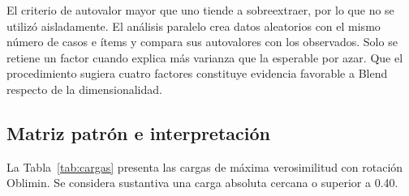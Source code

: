 \documentclass[11pt,letterpaper]{article}
\begin{document}
El criterio de autovalor mayor que uno tiende a sobreextraer, por lo que no se utilizó aisladamente. El análisis paralelo crea datos aleatorios con el mismo número de casos e ítems y compara sus autovalores con los observados. Solo se retiene un factor cuando explica más varianza que la esperable por azar. Que el procedimiento sugiera cuatro factores constituye evidencia favorable a Blend respecto de la dimensionalidad.

\subsection{Matriz patrón e interpretación}

La Tabla~\ref{tab:cargas} presenta las cargas de máxima verosimilitud con rotación Oblimin. Se considera sustantiva una carga absoluta cercana o superior a 0.40.
\end{document}
